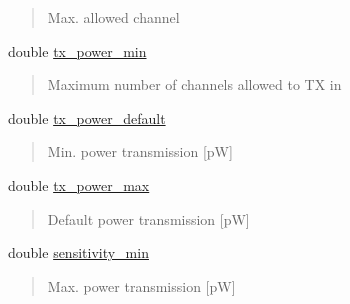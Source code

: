 \begin{DoxyCompactItemize}
\begin{DoxyCompactList}
\begin{quote}
Max. allowed channel \end{quote}
\end{DoxyCompactList}\item 
\mbox{\label{structCapabilities_abda141935667404464ef0a637db1ba2a}} 
double \hyperlink{structCapabilities_abda141935667404464ef0a637db1ba2a}{tx\+\_\+power\+\_\+min}
\begin{DoxyCompactList}\small\item\em \begin{quote}
Maximum number of channels allowed to TX in \end{quote}
\end{DoxyCompactList}\item 
\mbox{\label{structCapabilities_a1d452f9b15fb03b25d40bb92f455b6b5}} 
double \hyperlink{structCapabilities_a1d452f9b15fb03b25d40bb92f455b6b5}{tx\+\_\+power\+\_\+default}
\begin{DoxyCompactList}\small\item\em \begin{quote}
Min. power transmission \mbox{[}pW\mbox{]} \end{quote}
\end{DoxyCompactList}\item 
\mbox{\label{structCapabilities_ab8290a1aacc4a64c2c3033bd4ea5034f}} 
double \hyperlink{structCapabilities_ab8290a1aacc4a64c2c3033bd4ea5034f}{tx\+\_\+power\+\_\+max}
\begin{DoxyCompactList}\small\item\em \begin{quote}
Default power transmission \mbox{[}pW\mbox{]} \end{quote}
\end{DoxyCompactList}\item 
\mbox{\label{structCapabilities_a4477344b4ebea51cac5b63b14e20d50a}} 
double \hyperlink{structCapabilities_a4477344b4ebea51cac5b63b14e20d50a}{sensitivity\+\_\+min}
\begin{DoxyCompactList}\small\item\em \begin{quote}
Max. power transmission \mbox{[}pW\mbox{]} \end{quote}
\end{DoxyCompactList}\item 

\end{DoxyCompactItemize}
